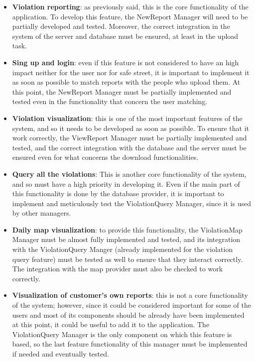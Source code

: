 \documentclass[../RASD.tex]{subfiles}
\begin{document}
    \begin{itemize}
        \item \textbf{Violation reporting}: as previously said, this is the core functionality of the application.
        To develop this feature, the NewReport Manager will need to be partially developed and tested.
        Moreover, the correct integration in the system of the server and database must be ensured, at least in the upload task.

        \item \textbf{Sing up and login}: even if this feature is not considered to have an high impact neither for the user nor for safe street,
        it is important to implement it as soon as possible to match reports with the people who upload them.
        At this point, the NewReport Manager must be partially implemented and tested even in the functionality that concern the user matching.

        \item \textbf{Violation visualization}: this is one of the most important features of the system, and so it needs to be developed as soon as possible.
        To ensure that it work correctly, the ViewReport Manager must be partially implemented and tested,
        and the correct integration with the database and the server must be ensured even for what concerns the download functionalities.

        \item \textbf{Query all the violations}: This is another core functionality of the system, and so must have a high priority in developing it.
        Even if the main part of this functionality is done by the database provider, it is important to implement and meticulously test the ViolationQuery Manager,
        since it is used by other managers.

        \item \textbf{Daily map visualization}: to provide this functionality, the ViolationMap Manager must be almost fully implemented and tested,
        and its integration with the ViolationQuery Manger (already implemented for the violation query feature) must be tested as well to ensure
        that they interact correctly.
        The integration with the map provider must also be checked to work correctly.

        \item \textbf{Visualization of customer’s own reports}: this is not a core functionality of the system;
        however, since it could be considered important for some of the users and most of its components should be already have been implemented at this point,
        it could be useful to add it to the application.
        The ViolationQuery Manager is the only component on which this feature is based, so the last feature functionality of this manager
        must be implemented if needed and eventually tested.


\end{itemize}
\end{document}
